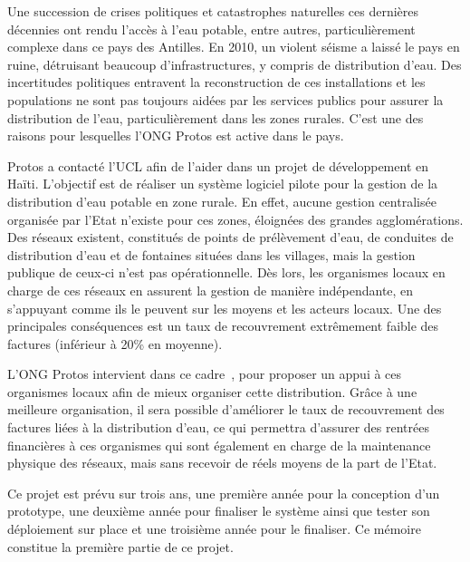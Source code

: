 \documentclass{EPL-master-thesis-covers-FR}
\begin{document}
			Une succession de crises politiques et catastrophes naturelles ces dernières décennies ont rendu l'accès à l'eau potable, entre autres, particulièrement complexe dans ce pays des Antilles. En 2010, un violent séisme a laissé le pays en ruine, détruisant beaucoup d'infrastructures, y compris de distribution d'eau. Des incertitudes politiques entravent la reconstruction de ces installations et les populations ne sont pas toujours aidées par les services publics pour assurer la distribution de l'eau, particulièrement dans les zones rurales. C'est une des raisons pour lesquelles l'ONG Protos est active dans le pays.

			Protos a contacté l'UCL afin de l'aider dans un projet de développement en Haïti. L'objectif est de réaliser un système logiciel pilote pour la gestion de la distribution d'eau potable en zone rurale. En effet, aucune gestion centralisée organisée par l'Etat n'existe pour ces zones, éloignées des grandes agglomérations. Des réseaux existent, constitués de points de prélèvement d'eau, de conduites de distribution d'eau et de fontaines situées dans les villages, mais la gestion publique de ceux-ci n'est pas opérationnelle. Dès lors, les organismes locaux en charge de ces réseaux en assurent la gestion de manière indépendante, en s'appuyant comme ils le peuvent sur les moyens et les acteurs locaux. Une des principales conséquences est un taux de recouvrement extrêmement faible des factures (inférieur à 20\% en moyenne).

			L'ONG Protos intervient dans ce cadre~\cite{ref:programme_protos}, pour proposer un appui à ces organismes locaux afin de mieux organiser cette distribution. Grâce à une meilleure organisation, il sera possible d'améliorer le taux de recouvrement des factures liées à la distribution d'eau, ce qui permettra d'assurer des rentrées financières à ces organismes qui sont également en charge de la maintenance physique des réseaux, mais sans recevoir de réels moyens de la part de l'Etat.

			Ce projet est prévu sur trois ans, une première année pour la conception d'un prototype, une deuxième année pour finaliser le système ainsi que tester son déploiement sur place et une troisième année pour le finaliser. Ce mémoire constitue la première partie de ce projet.
\end{document}
